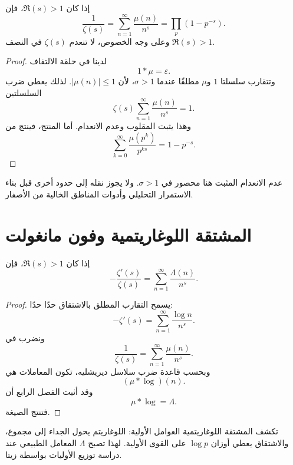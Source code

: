 \begin{corollary}
\label{cor:mobius-reciprocal-zeta}
\provedhere
إذا كان \(\Re(s)>1\)، فإن
\[
\frac1{\zeta(s)}
=
\sum_{n=1}^{\infty}\frac{\mu(n)}{n^s}
=
\prod_p(1-p^{-s}).
\]
وعلى وجه الخصوص، لا تنعدم \(\zeta(s)\) في النصف \(\Re(s)>1\).
\end{corollary}

\begin{proof}
لدينا في حلقة الالتفاف
\[
1*\mu=\varepsilon.
\]
وتتقارب سلسلتا \(1\) و\(\mu\) مطلقًا عندما \(\sigma>1\)، لأن
\(|\mu(n)|\leq1\). لذلك يعطي ضرب السلسلتين
\[
\zeta(s)
\sum_{n=1}^{\infty}\frac{\mu(n)}{n^s}
=
1.
\]
وهذا يثبت المقلوب وعدم الانعدام. أما المنتج، فينتج من
\[
\sum_{k=0}^{\infty}\frac{\mu(p^k)}{p^{ks}}
=1-p^{-s}.
\]
\end{proof}

\begin{remark}
عدم الانعدام المثبت هنا محصور في \(\sigma>1\). ولا يجوز نقله إلى حدود
أخرى قبل بناء الاستمرار التحليلي وأدوات المناطق الخالية من الأصفار.
\end{remark}

\section{المشتقة اللوغاريتمية وفون مانغولت}

\begin{theorem}
\label{thm:zeta-logarithmic-derivative-von-mangoldt}
\provedhere
إذا كان \(\Re(s)>1\)، فإن
\[
-\frac{\zeta'(s)}{\zeta(s)}
=
\sum_{n=1}^{\infty}\frac{\Lambda(n)}{n^s}.
\]
\end{theorem}

\begin{proof}
يسمح التقارب المطلق بالاشتقاق حدًا حدًا:
\[
-\zeta'(s)
=
\sum_{n=1}^{\infty}\frac{\log n}{n^s}.
\]
ونضرب في
\[
\frac1{\zeta(s)}
=
\sum_{n=1}^{\infty}\frac{\mu(n)}{n^s}.
\]
وبحسب قاعدة ضرب سلاسل ديريشليه، تكون المعاملات هي
\[
(\mu*\log)(n).
\]
وقد أثبت الفصل الرابع أن
\[
\mu*\log=\Lambda.
\]
فتنتج الصيغة.
\end{proof}

\begin{remark}
تكشف المشتقة اللوغاريتمية العوامل الأولية: اللوغاريتم يحول الجداء إلى
مجموع، والاشتقاق يعطي أوزان \(\log p\) على القوى الأولية. لهذا تصبح
\(\Lambda\) المعامل الطبيعي عند دراسة توزيع الأوليات بواسطة زيتا.
\end{remark}

